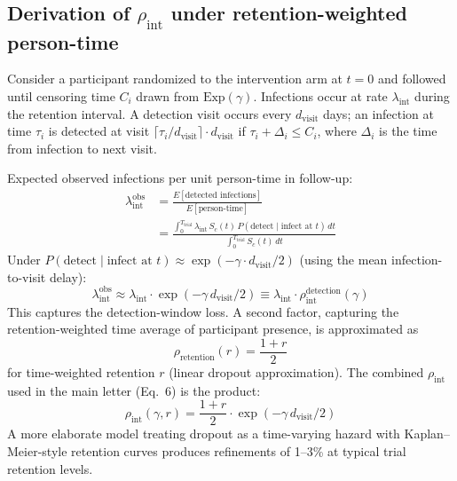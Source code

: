 \documentclass[11pt]{article}
\begin{document}
\subsection[Derivation of rho\_int under retention-weighted person-time]{Derivation of \texorpdfstring{\ensuremath{\rho_{\mathrm{int}}}}{rho_int} under retention-weighted person-time}


Consider a participant randomized to the intervention arm at $t=0$ and followed until censoring time $C_i$ drawn from $\mathrm{Exp}(\gamma)$. Infections occur at rate $\lambda_{\mathrm{int}}$ during the retention interval. A detection visit occurs every $d_{\mathrm{visit}}$ days; an infection at time $\tau_i$ is detected at visit $\lceil \tau_i / d_{\mathrm{visit}} \rceil \cdot d_{\mathrm{visit}}$ if $\tau_i + \Delta_i \leq C_i$, where $\Delta_i$ is the time from infection to next visit.

Expected observed infections per unit person-time in follow-up:
\begin{align}
\lambda^{\mathrm{obs}}_{\mathrm{int}} &= \frac{E[\text{detected infections}]}{E[\text{person-time}]} \\
&= \frac{\int_0^{T_{\mathrm{trial}}} \lambda_{\mathrm{int}}\, S_c(t)\, P(\text{detect} \mid \text{infect at } t)\,dt}{\int_0^{T_{\mathrm{trial}}} S_c(t)\,dt}
\end{align}
Under $P(\text{detect} \mid \text{infect at } t) \approx \exp(-\gamma \cdot d_{\mathrm{visit}}/2)$ (using the mean infection-to-visit delay):
\begin{equation}
\lambda^{\mathrm{obs}}_{\mathrm{int}} \approx \lambda_{\mathrm{int}} \cdot \exp(-\gamma\, d_{\mathrm{visit}}/2) \equiv \lambda_{\mathrm{int}} \cdot \rho_{\mathrm{int}}^{\text{detection}}(\gamma)
\end{equation}
This captures the detection-window loss. A second factor, capturing the retention-weighted time average of participant presence, is approximated as
\begin{equation}
\rho_{\mathrm{retention}}(r) = \frac{1+r}{2}
\end{equation}
for time-weighted retention $r$ (linear dropout approximation). The combined $\rho_{\mathrm{int}}$ used in the main letter (Eq.~6) is the product:
\begin{equation}
\rho_{\mathrm{int}}(\gamma, r) = \frac{1+r}{2} \cdot \exp(-\gamma\, d_{\mathrm{visit}}/2)
\end{equation}
A more elaborate model treating dropout as a time-varying hazard with Kaplan--Meier-style retention curves produces refinements of 1--3\% at typical trial retention levels.
\end{document}
